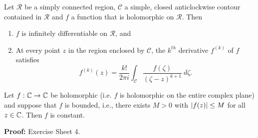 



\begin{theorem}
\label{t:cauchyd}
Let $\mathcal{R}$ be a simply connected region, $\mathcal{C}$ a simple, closed anticlockwise contour contained in $\mathcal{R}$ and $f$ a function that is holomorphic on $\mathcal{R}$. Then
\begin{enumerate}
\item $f$ is infinitely differentiable on $\mathcal{R}$, and
\item At every point $z$ in the region enclosed by $\mathcal{C}$, the $k^{th}$ derivative $f^{(k)}$ of $f$ satisfies
\[
f^{(k)}(z) = \frac{k!}{2\pi i} \int_{\mathcal{C}} \frac{f(\zeta)}{(\zeta-z)^{k+1}}\ d \zeta.
\]
\end{enumerate}
\end{theorem}

\begin{theorem}
Let $f:\mathbb{C} \to \mathbb{C}$ be holomorphic (i.e. $f$ is holomorphic on the entire complex plane) and suppose that $f$ is bounded, i.e., there exists $M>0$ with $\left| f(z) \right|\leq M$ for all $z \in \mathbb{C}$.  Then $f$ is constant.
\end{theorem}
{\bf Proof: } Exercise Sheet 4.

